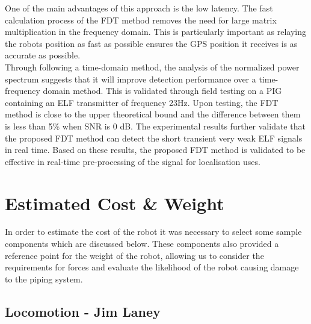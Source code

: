 \documentclass[11pt]{article}		%
\begin{document}
		
		One of the main advantages of this approach is the low latency. The fast calculation process of the FDT method removes the need for large matrix multiplication in the frequency domain. This is particularly important as relaying the robots position as fast as possible ensures the GPS position it receives is as accurate as possible. \\
    	\hspace*{3ex}Through following a time-domain method, the analysis of the normalized power spectrum suggests that it will improve detection performance over a time-frequency domain method. This is validated through field testing on a PIG containing an ELF transmitter of frequency 23Hz. Upon testing, the FDT method is close to the upper theoretical bound and the difference between them is less than 5\%  when SNR is 0 dB. The experimental results further validate that the proposed FDT method can detect the short transient very weak ELF signals in real time. Based on these results, the proposed FDT method is validated to be effective in real-time pre-processing of the signal for localisation uses.
		
		
		
		
	\section{Estimated Cost \& Weight}
		
		In order to estimate the cost of the robot it was necessary to select some sample components which are discussed below.
		These components also provided a reference point for the weight of the robot, allowing us to consider the requirements for forces and evaluate the likelihood of the robot causing damage to the piping system.
		
		\subsection[Locomotion]{Locomotion - Jim Laney}
		
\end{document}
